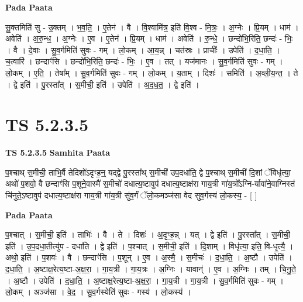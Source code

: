 \documentclass[17pt]{extarticle}
\begin{document}
\textbf{Pada Paata} \newline

सू॒क्तमिति॑ सु - उ॒क्तम् । भ॒व॒ति॒ । ए॒तेन॑ । वै । वि॒श्वामि॑त्र॒ इति॑ वि॒श्व - मि॒त्रः॒ । अ॒ग्नेः । प्रि॒यम् । धाम॑ । अवेति॑ । अ॒रु॒न्ध॒ । अ॒ग्नेः । ए॒व । ए॒तेन॑ । प्रि॒यम् । धाम॑ । अवेति॑ । रु॒न्धे॒ । छन्दो॑भि॒रिति॒ छन्दः॑ - भिः॒ । वै । दे॒वाः । सु॒व॒र्गमिति॑ सुवः - गम् । लो॒कम् । आ॒य॒न्न् । चत॑स्रः । प्राचीः᳚ । उपेति॑ । द॒धा॒ति॒ । च॒त्वारि॑ । छन्दाꣳ॑सि । छन्दो॑भि॒रिति॒ छन्दः॑ - भिः॒ । ए॒व । तत् । यज॑मानः । सु॒व॒र्गमिति॑ सुवः - गम् । लो॒कम् । ए॒ति॒ । तेषा᳚म् । सु॒व॒र्गमिति॑ सुवः - गम् । लो॒कम् । य॒ताम् । दिशः॑ । समिति॑ । अ॒व्ली॒य॒न्त॒ । ते । द्वे इति॑ । पु॒रस्ता᳚त् । स॒मीची॒ इति॑ । उपेति॑ । अ॒द॒ध॒त॒ । द्वे इति॑ ।  \newline




\section*{ TS 5.2.3.5 }

\textbf{TS 5.2.3.5 } \newline
\textbf{Samhita Paata} \newline

प॒श्चाथ् स॒मीची॒ ताभि॒र्वै तेदिशो॑ऽदृꣳह॒न्॒ यद्द्वे पु॒रस्ता᳚थ् स॒मीची॑ उप॒दधा॑ति॒ द्वे प॒॒श्चाथ् स॒मीची॑ दि॒शां ॅविधृ॑त्या॒ अथो॑ प॒शवो॒ वै छन्दाꣳ॑सि प॒शूने॒वास्मै॑ स॒मीचो॑ दधात्य॒ष्टावुप॑ दधात्य॒ष्टाक्ष॑रा गाय॒त्री गा॑य॒त्रो᳚ऽग्नि-र्यावा॑ने॒वाग्निस्तं चि॑नुते॒ऽष्टावुप॑ दधात्य॒ष्टाक्ष॑रा गाय॒त्री गा॑य॒त्री सु॑व॒र्गं ॅलो॒कमञ्ज॑सा वेद सुव॒र्गस्य॑ लो॒कस्य॒ - [  ] \newline

\textbf{Pada Paata} \newline

प॒श्चात् । स॒मीची॒ इति॑ । ताभिः॑ । वै । ते । दिशः॑ । अ॒दृꣳ॒॒ह॒न्न् । यत् । द्वे इति॑ । पु॒रस्ता᳚त् । स॒मीची॒ इति॑ । उ॒प॒दधा॒तीत्यु॑प - दधा॑ति । द्वे इति॑ । प॒श्चात् । स॒मीची॒ इति॑ । दि॒शाम् । विधृ॑त्या॒ इति॒ वि-धृ॒त्यै॒ । अथो॒ इति॑ । प॒शवः॑ । वै । छन्दाꣳ॑सि । प॒शून् । ए॒व । अ॒स्मै॒ । स॒मीचः॑ । द॒धा॒ति॒ । अ॒ष्टौ । उपेति॑ । द॒धा॒ति॒ । अ॒ष्टाक्ष॒रेत्य॒ष्टा-अ॒क्ष॒रा॒ । गा॒य॒त्री । गा॒य॒त्रः । अ॒ग्निः । यावान्॑ । ए॒व । अ॒ग्निः । तम् । चि॒नु॒ते॒ । अ॒ष्टौ । उपेति॑ । द॒धा॒ति॒ । अ॒ष्टाक्ष॒रेत्य॒ष्टा-अ॒क्ष॒रा॒ । गा॒य॒त्री । गा॒य॒त्री । सु॒व॒र्गमिति॑ सुवः - गम् । लो॒कम् । अञ्ज॑सा । वे॒द॒ । सु॒व॒र्गस्येति॑ सुवः - गस्य॑ । लो॒कस्य॑ ।  \newline
\end{document}
